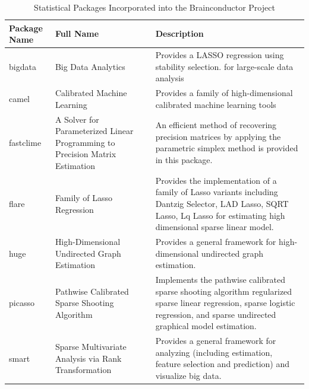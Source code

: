 \documentclass{nature}
\begin{document}
\begin{table}
\begin{footnotesize}
\begin{center}
    \begin{tabular}{ | l | p{4cm} |  p{6cm} |}
    \hline
	Package Name & Full Name & Description \\ \hline
	bigdata & Big Data Analytics & Provides a LASSO regression using stability
selection.
	for large-scale data analysis \\\hline
	camel & Calibrated Machine Learning & Provides a family of high-dimensional calibrated machine learning tools \\\hline
	fastclime & A Solver for Parameterized Linear Programming to Precision Matrix
Estimation &
	An efficient method of recovering precision matrices by applying the parametric
simplex method is provided in this package.  \\\hline
	flare & Family of Lasso Regression &
	Provides the implementation of a family of Lasso variants including Dantzig
Selector, LAD Lasso, SQRT Lasso, Lq Lasso for estimating high dimensional sparse
linear model. \\\hline
	huge & High-Dimensional Undirected Graph Estimation &
	Provides a general framework for high-dimensional undirected graph
estimation.\\\hline
	picasso &  Pathwise Calibrated Sparse Shooting Algorithm & Implements the
pathwise calibrated sparse shooting algorithm regularized sparse linear
regression, sparse logistic regression, and sparse undirected graphical model
estimation. \\\hline
	smart & Sparse Multivariate Analysis via Rank Transformation & Provides a
general framework for analyzing (including estimation, feature selection and
prediction) and visualize big data. \\\hline
    \end{tabular}
   \caption{Statistical Packages Incorporated into the Brainconductor Project}
   \label{tab:stat}
\end{center}
\end{footnotesize}
\end{table}
\end{document}

